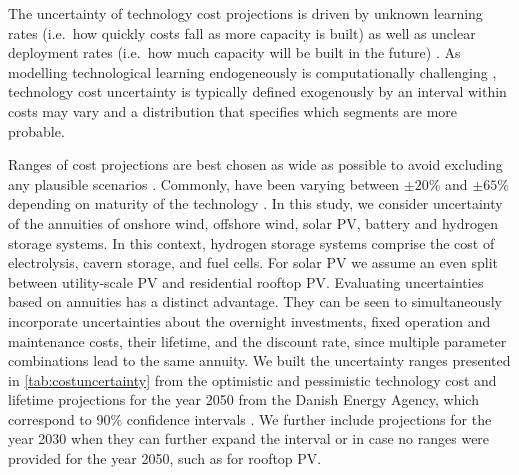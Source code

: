 
The uncertainty of technology cost projections is driven 
by unknown learning rates (i.e.~how quickly costs fall as more capacity is built)
as well as unclear deployment rates (i.e.~how much capacity will be built in the future) \cite{gritsevskyi_modeling_2000,yeh_review_2012}.
As modelling technological learning endogeneously is computationally challenging \cite{heuberger_power_2017,mattsson_learning_2019},
technology cost uncertainty is typically defined exogenously by an interval within costs may vary
and a distribution that specifies which segments are more probable.


Ranges of cost projections are best chosen as wide as possible to avoid excluding any plausible scenarios \cite{moret_characterization_2017,mccollum_energy_2020}.
Commonly, have been varying between $\pm20\%$ and $\pm65\%$ depending on maturity of the technology \cite{moret_characterization_2017,shirizadeh_how_2019,pizarro-alonso_uncertainties_2019,li_using_2020,trondle_trade-offs_2020}.
In this study, we consider uncertainty of the annuities of
onshore wind, offshore wind, solar PV, battery and hydrogen storage systems.
In this context, hydrogen storage systems comprise the cost of
electrolysis, cavern storage, and fuel cells.
For solar PV we assume an even split between utility-scale PV and residential rooftop PV.
Evaluating uncertainties based on annuities has a distinct advantage.
They can be seen to simultaneously incorporate uncertainties about
the overnight investments, fixed operation and maintenance costs,
their lifetime, and the discount rate,
since multiple parameter combinations lead to the same annuity.
We built the uncertainty ranges presented in \cref{tab:costuncertainty}
from the optimistic and pessimistic technology cost
and lifetime projections for the year 2050 from the Danish Energy Agency,
which correspond to 90\% confidence intervals \cite{DEA}.
We further include projections for the year 2030 when they can further expand the interval
or in case no ranges were provided for the year 2050, such as for rooftop PV.


